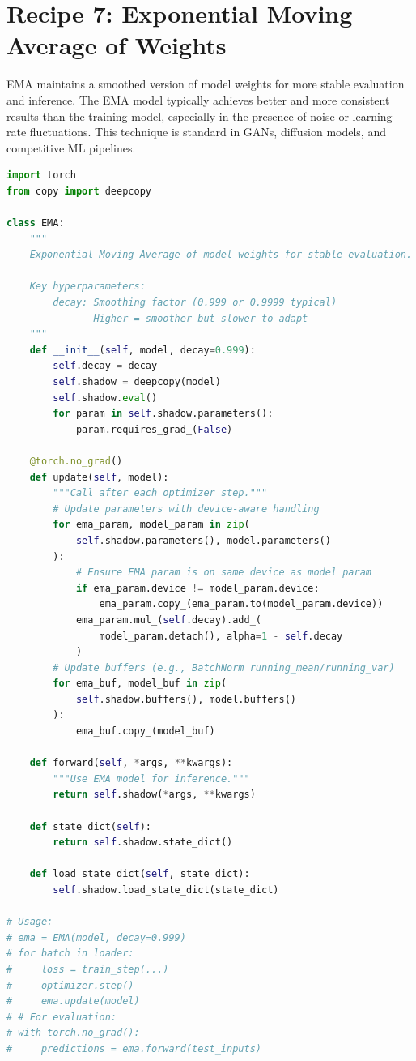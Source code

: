 \documentclass[../main.tex]{subfiles}
\begin{document}
\section{Recipe 7: Exponential Moving Average of Weights}\label{sec:recipe-ema}

EMA maintains a smoothed version of model weights for more stable evaluation and inference. The EMA model typically achieves better and more consistent results than the training model, especially in the presence of noise or learning rate fluctuations. This technique is standard in GANs, diffusion models, and competitive ML pipelines.

\begin{lstlisting}[language=Python]
import torch
from copy import deepcopy

class EMA:
    """
    Exponential Moving Average of model weights for stable evaluation.

    Key hyperparameters:
        decay: Smoothing factor (0.999 or 0.9999 typical)
               Higher = smoother but slower to adapt
    """
    def __init__(self, model, decay=0.999):
        self.decay = decay
        self.shadow = deepcopy(model)
        self.shadow.eval()
        for param in self.shadow.parameters():
            param.requires_grad_(False)

    @torch.no_grad()
    def update(self, model):
        """Call after each optimizer step."""
        # Update parameters with device-aware handling
        for ema_param, model_param in zip(
            self.shadow.parameters(), model.parameters()
        ):
            # Ensure EMA param is on same device as model param
            if ema_param.device != model_param.device:
                ema_param.copy_(ema_param.to(model_param.device))
            ema_param.mul_(self.decay).add_(
                model_param.detach(), alpha=1 - self.decay
            )
        # Update buffers (e.g., BatchNorm running_mean/running_var)
        for ema_buf, model_buf in zip(
            self.shadow.buffers(), model.buffers()
        ):
            ema_buf.copy_(model_buf)

    def forward(self, *args, **kwargs):
        """Use EMA model for inference."""
        return self.shadow(*args, **kwargs)

    def state_dict(self):
        return self.shadow.state_dict()

    def load_state_dict(self, state_dict):
        self.shadow.load_state_dict(state_dict)

# Usage:
# ema = EMA(model, decay=0.999)
# for batch in loader:
#     loss = train_step(...)
#     optimizer.step()
#     ema.update(model)
# # For evaluation:
# with torch.no_grad():
#     predictions = ema.forward(test_inputs)
\end{lstlisting}
\end{document}
